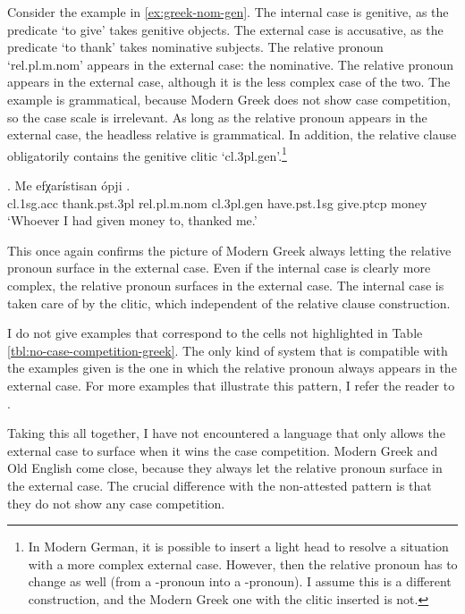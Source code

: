 Consider the example in \ref{ex:greek-nom-gen}.
The internal case is genitive, as the predicate  `to give' takes genitive objects.
The external case is accusative, as the predicate  `to thank' takes nominative subjects.
The relative pronoun  `\ac{rel}.\ac{pl}.\ac{m}.\ac{nom}' appears in the external case: the nominative.
The relative pronoun appears in the external case, although it is the less complex case of the two. The example is grammatical, because Modern Greek does not show case competition, so the case scale is irrelevant. As long as the relative pronoun appears in the external case, the headless relative is grammatical. In addition, the relative clause obligatorily contains the genitive clitic  `\ac{cl}.3\ac{pl}.\ac{gen}'.\footnote{
In Modern German, it is possible to insert a light head to resolve a situation with a more complex external case. However, then the relative pronoun has to change as well (from a -pronoun into a -pronoun). I assume this is a different construction, and the Modern Greek one with the clitic inserted is not.
}

\exg. Me efχarístisan ópji    .\\
 \ac{cl}.1\ac{sg}.\ac{acc} thank.\ac{pst}.3\ac{pl}\scsub{[nom]} \ac{rel}.\ac{pl}.\ac{m}.\ac{nom} \ac{cl}.3\ac{pl}.\ac{gen} have.\ac{pst}.1\ac{sg} give.\ac{ptcp}\scsub{[gen]} money\\
 `Whoever I had given money to, thanked me.'\label{ex:greek-nom-gen}

This once again confirms the picture of Modern Greek always letting the relative pronoun surface in the external case. Even if the internal case is clearly more complex, the relative pronoun surfaces in the external case. The internal case is taken care of by the clitic, which independent of the relative clause construction.

I do not give examples that correspond to the cells not highlighted in Table \ref{tbl:no-case-competition-greek}. The only kind of system that is compatible with the examples given is the one in which the relative pronoun always appears in the external case. For more examples that illustrate this pattern, I refer the reader to .

Taking this all together, I have not encountered a language that only allows the external case to surface when it wins the case competition. Modern Greek and Old English come close, because they always let the relative pronoun surface in the external case. The crucial difference with the non-attested pattern is that they do not show any case competition.


